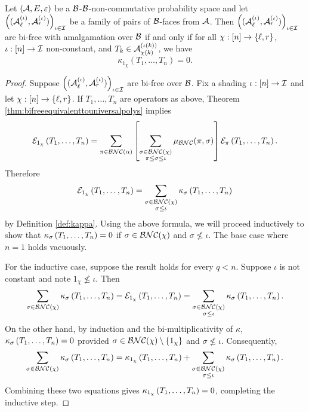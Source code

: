 		\begin{theorem}
			\label{thmequivalenceofbifreeandcombintoriallybifree}
			Let $(\mathcal{A}, E, \varepsilon)$ be a $\mathcal{B}$-$\mathcal{B}$-non-commutative probability space and let $\left((\mathcal{A}_\ell^{(\iota)}, \mathcal{A}_r^{(\iota)})\right)_{\iota\in\mathcal{I}}$ be a family of pairs of $\mathcal{B}$-faces from $\mathcal{A}$.
			Then $\left((\mathcal{A}_\ell^{(\iota)}, \mathcal{A}_r^{(\iota)})\right)_{\iota\in\mathcal{I}}$ are bi-free with amalgamation over $\mathcal{B}$ if and only if for all $\chi : [n] \to \left\{\ell, r\right\}$, $\iota : [n] \to \mathcal{I}$ non-constant, and $T_k \in \mathcal{A}_{\chi(k)}^{(\iota(k))}$, we have
			\[\kappa_{1_\chi}(T_1, \ldots, T_n) = 0.\]
		\end{theorem}

		\begin{proof}
			Suppose $\left((\mathcal{A}_\ell^{(\iota)}, \mathcal{A}_r^{(\iota)})\right)_{\iota\in\mathcal{I}}$ are bi-free over $\mathcal{B}$.
			Fix a shading $\iota : [n] \to \mathcal{I}$ and let $\chi : [n] \to \left\{\ell, r\right\}$.
			If $T_1, \ldots, T_n$ are operators as above, Theorem \ref{thm:bifreeequivalenttouniversalpolys} implies
			\[
				\mathcal{E}_{1_\chi}\left( T_1, \ldots, T_n\right)
				= \sum_{{\pi \in \mathcal{BNC}(\alpha)}} \left[
				\sum_{\substack{\sigma \in \mathcal{BNC}(\chi) \\ \pi \leq \sigma \leq \iota}} \mu_{\mathcal{BNC}}(\pi, \sigma) \right] \mathcal{E}_{\pi}\left( T_1, \ldots, T_n\right).
			\]
			Therefore
			\[
				\mathcal{E}_{1_\chi}\left( T_1, \ldots, T_n \right) = \sum_{\substack{\sigma \in \mathcal{BNC}(\chi) \\ \sigma \leq \iota}} \kappa_\sigma\left(T_1, \ldots, T_n\right)
			\]
			by Definition \ref{def:kappa}.
			Using the above formula, we will proceed inductively to show that $\kappa_\sigma\left(T_1, \ldots, T_n\right) = 0$ if $\sigma \in \mathcal{BNC}(\chi)$ and $\sigma \nleq \iota$.
			The base case where $n = 1$ holds vacuously.



			For the inductive case, suppose the result holds for every $q < n$.
			Suppose $\iota$ is not constant and note $1_\chi \nleq \iota$.
			Then
			\[
				\sum_{\sigma \in \mathcal{BNC}(\chi)} \kappa_\sigma\left( T_1, \ldots, T_n \right)
				= \mathcal{E}_{1_\chi}\left( T_1, \ldots, T_n \right)
				= \sum_{\substack{\sigma \in \mathcal{BNC}(\chi) \\ \sigma \leq \iota}} \kappa_\sigma\left(T_1, \ldots, T_n\right).
			\]
			On the other hand, by induction and the bi-multiplicativity of $\kappa$, $\kappa_\sigma\left(T_1, \ldots, T_n\right) = 0$ provided $\sigma \in \mathcal{BNC}(\chi)\setminus \left\{1_\chi\right\}$ and $\sigma \nleq \iota$.
			Consequently,
			\[
				\sum_{\sigma \in \mathcal{BNC}(\chi)} \kappa_\sigma\left( T_1, \ldots, T_n \right) = \kappa_{1_\chi}\left( T_1, \ldots, T_n \right) + \sum_{\substack{\sigma \in \mathcal{BNC}(\chi) \\ \sigma \leq \iota}} \kappa_\sigma\left( T_1, \ldots, T_n \right).
			\]
			Combining these two equations gives $\kappa_{1_\chi}\left( T_1, \ldots, T_n \right) = 0$, completing the inductive step.


\end{proof}
